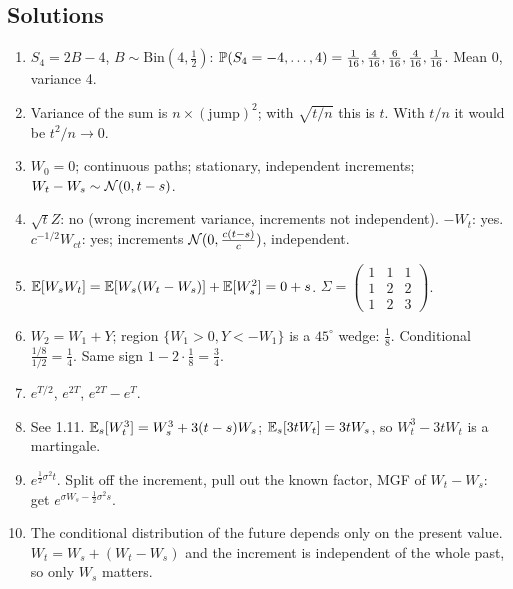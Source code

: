 \documentclass[10pt]{article}
\begin{document}
\subsection*{Solutions}
\begin{enumerate}[label=S\arabic*.]
\item $S_4=2B-4$, $B\sim\mathrm{Bin}(4,\frac12)$: $\mathbb{P}(S_4=-4,\dots,4)=\frac1{16},\frac4{16},\frac6{16},\frac4{16},\frac1{16}$. Mean 0, variance 4.
\item Variance of the sum is $n\times(\text{jump})^2$; with $\sqrt{t/n}$ this is $t$. With $t/n$ it would be $t^2/n\to0$.
\item $W_0=0$; continuous paths; stationary, independent increments; $W_t-W_s\sim\mathcal{N}(0,t-s)$.
\item $\sqrt tZ$: no (wrong increment variance, increments not independent). $-W_t$: yes. $c^{-1/2}W_{ct}$: yes; increments $\mathcal{N}(0,\frac{c(t-s)}{c})$, independent.
\item $\mathbb{E}[W_sW_t]=\mathbb{E}[W_s(W_t-W_s)]+\mathbb{E}[W_s^2]=0+s$. $\Sigma=\begin{pmatrix}1&1&1\\1&2&2\\1&2&3\end{pmatrix}$.
\item $W_2=W_1+Y$; region $\{W_1>0,Y<-W_1\}$ is a $45^\circ$ wedge: $\frac18$. Conditional $\frac{1/8}{1/2}=\frac14$. Same sign $1-2\cdot\frac18=\frac34$.
\item $e^{T/2}$, $e^{2T}$, $e^{2T}-e^T$.
\item See 1.11. $\mathbb{E}_s[W_t^3]=W_s^3+3(t-s)W_s$; $\mathbb{E}_s[3tW_t]=3tW_s$, so $W_t^3-3tW_t$ is a martingale.
\item $e^{\frac12\sigma^2t}$. Split off the increment, pull out the known factor, MGF of $W_t-W_s$: get $e^{\sigma W_s-\frac12\sigma^2s}$.
\item The conditional distribution of the future depends only on the present value. $W_t=W_s+(W_t-W_s)$ and the increment is independent of the whole past, so only $W_s$ matters.
\end{enumerate}
\end{document}
